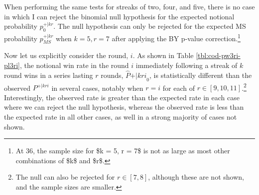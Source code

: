 \documentclass{article}
\begin{document}
When performing the same tests for streaks of two, four, and five, there
is no case in which I can reject the binomial null hypothesis for the
expected notional probability \(p^{+|kr}_0\). The null hypothesis can
only be rejected for the expected MS probability \(p^{+|kr}_{MS}\) when
\(k = 5, r = 7\) after applying the BY p-value correction.\footnote{At
  36, the sample size for \$k = 5, r = 7\$ is not as large as most other
  combinations of \$k\$ and \$r\$.}

Now let us explicitly consider the round, \(i\). As shown in Table
\ref{tbl:cod-pw3ri-pl3ri}, the notional win rate in the round \(i\)
immediately following a streak of \(k\) round wins in a series lasting
\(r\) rounds, \(\hat{P}{+|kri}_0\), is statistically different than the
observed \(P^{+|kri}\) in several cases, notably when \(r = i\) for each
of \(r \in [9, 10, 11]\).\footnote{The null can also be rejected for
  \(r \in [7, 8]\), although these are not shown, and the sample sizes
  are smaller.} Interestingly, the observed rate is greater than the
expected rate in each case where we can reject the null hypothesis,
whereas the observed rate is less than the expected rate in all other
cases, as well in a strong majority of cases not shown.
\end{document}
